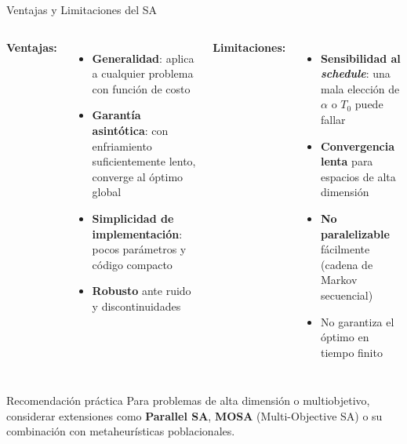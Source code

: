 \documentclass[aspectratio=169,xcolor=dvipsnames]{beamer}
\begin{document}
\begin{frame}{Ventajas y Limitaciones del SA}
    \footnotesize
    \begin{columns}
        \textbf{Ventajas:}
        \begin{itemize}
            \item \textbf{Generalidad}: aplica a cualquier problema con función de costo
            \item \textbf{Garantía asintótica}: con enfriamiento suficientemente lento, converge al óptimo global
            \item \textbf{Simplicidad de implementación}: pocos parámetros y código compacto
            \item \textbf{Robusto} ante ruido y discontinuidades
        \end{itemize}
        \textbf{Limitaciones:}
        \begin{itemize}
            \item \textbf{Sensibilidad al \textit{schedule}}: una mala elección de $\alpha$ o $T_0$ puede fallar
            \item \textbf{Convergencia lenta} para espacios de alta dimensión
            \item \textbf{No paralelizable} fácilmente (cadena de Markov secuencial)
            \item No garantiza el óptimo en tiempo finito
        \end{itemize}
    \end{columns}
    \vspace{0.3cm}
    \begin{alertblock}{Recomendación práctica}
        Para problemas de alta dimensión o multiobjetivo, considerar extensiones como \textbf{Parallel SA}, \textbf{MOSA} (Multi-Objective SA) o su combinación con metaheurísticas poblacionales.
    \end{alertblock}
\end{frame}
\end{document}
